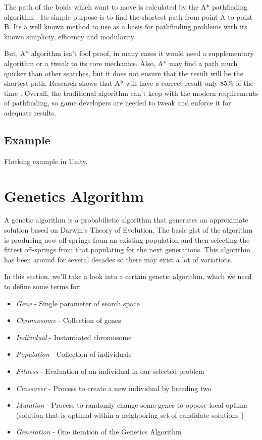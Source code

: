 \documentclass[a4paper, 12pt]{book}
\begin{document}
The path of the boids which want to move is calculated by the A* pathfinding algorithm \cite{FOEAD2021507}. Its simple purpose is to find the shortest path from point A to point B. Its a well known method to use as a basis for pathfinding problems with its known  simplicty, efficency and modularity.

But, A* algorithm isn't fool proof, in many cases it would need a supplementary algorithm or a tweak to its core mechanics. Also, A* may find a path much quicker than other searches, but it does not ensure that the result will be the shortest path. Research shows that A* will have a correct result only 85\% of the time \cite{FOEAD2021507}. Overall, the traditional algorithm can't keep with the modern requirements of pathfinding, so game developers are needed to tweak and enforce it for adequate results.

\subsection{Example}

Flocking example in Unity.

\section{Genetics Algorithm}

A genetic algorithm \cite{GameAIGeneticAlg} is a probabilistic algorithm that generates an approximate solution based on Darwin’s Theory of Evolution. The basic gist of the algorithm is producing new off-springs from an existing population and then selecting the fittest off-springs from that populating for the next generations. This algorithm has been around for several decades so there may exist a lot of variations.

In this section, we'll take a look into a certain genetic algorithm, which we need to define some terms for:

\begin{itemize}
    \item \emph{Gene} - Single parameter of search space
    \item \emph{Chromosome} - Collection of genes
    \item \emph{Individual} - Instantiated chromosome
    \item \emph{Population} - Collection of individuals
    \item \emph{Fitness} - Evaluation of an individual in our selected problem
    \item \emph{Crossover} - Process to create a new individual by breeding two
    \item \emph{Mutation} - Process to randomly change some genes to oppose local optima (solution that is optimal within a neighboring set of candidate solutions \cite{LocalOptimum}) 
    \item \emph{Generation} - One iteration of the Genetics Algorithm
\end{itemize}
\end{document}
